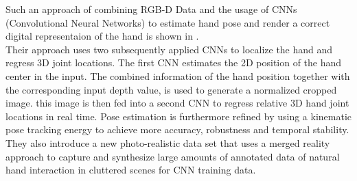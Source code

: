 Such an approach of combining RGB-D Data and the usage of CNNs (Convolutional Neural Networks) to estimate hand pose and render a correct digital representaion of the hand is shown in \cite{FranziskaMueller.2017}.
\\Their approach uses two subsequently applied CNNs to localize the hand and regress 3D joint locations. The first CNN estimates the 2D position of the hand center in the input. The combined information of the hand position together with the corresponding input depth value, is used to generate a normalized cropped image. this image is then fed into a second CNN to regress relative 3D hand joint
locations in real time. Pose estimation is furthermore refined by using a kinematic pose tracking energy to achieve more accuracy, robustness and
temporal stability.
\\They also introduce a new photo-realistic data set that uses a merged reality
approach to capture and synthesize large amounts of annotated
data of natural hand interaction in cluttered scenes for CNN training data.